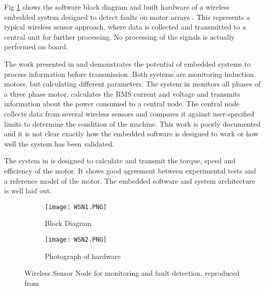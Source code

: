 Fig \ref{fig:WSN} shows the software block diagram and built hardware of a wireless embedded system designed to detect faults on motor arrays \cite{VIB_wireless_sensor}.
This represents a typical wireless sensor approach, where data is collected and transmitted to a central unit for further processing.
No processing of the signals is actually performed on board.
\par
The work presented in \cite{Embedded_WSN} and \cite{Embedded_WSN2} demonstrates the potential of embedded systems to process information before transmission.
Both systems are monitoring induction motors, but calculating different parameters.
The system in \cite{Embedded_WSN} monitors all phases of a three phase motor, calculates the RMS current and voltage and transmits information about the power consumed to a central node.
The central node collects data from several wireless sensors and compares it against user-specified limits to determine the condition of the machine.
This work is poorly documented and it is not clear exactly how the embedded software is designed to work or how well the system has been validated.
\par
The system in \cite{Embedded_WSN2} is designed to calculate and transmit the torque, speed and efficiency of the motor.
It shows good agreement between experimental tests and a reference model of the motor.
The embedded software and system architecture is well laid out.


\begin{figure}
  \centering
  \begin{subfigure}[b]{0.49\textwidth}
    \texttt{[image: WSN1.PNG]}
    \caption{Block Diagram}
  \end{subfigure}
  \begin{subfigure}[b]{0.49\textwidth}
    \texttt{[image: WSN2.PNG]}
    \caption{Photograph of hardware}
  \end{subfigure}
  \caption{Wireless Sensor Node for monitoring and fault detection, reproduced from \cite{VIB_wireless_sensor}}
  \label{fig:WSN}
\end{figure}



